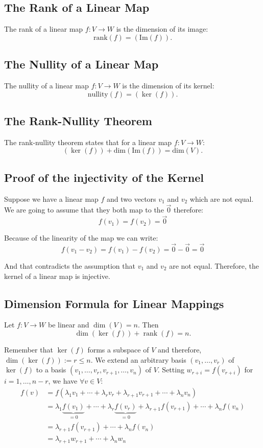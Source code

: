 \subsection{The Rank of a Linear Map}
The rank of a linear map \( f: V \to W \) is the dimension of its image:
    \[
    \text{rank}(f) = (\text{Im}(f)).
    \]
\subsection{The Nullity of a Linear Map}
The nullity of a linear map \( f: V \to W \) is the dimension of its kernel:
    \[
    \text{nullity}(f) = (\ker(f)).
    \]
\subsection{The Rank-Nullity Theorem}
The rank-nullity theorem states that for a linear map \( f: V \to W \):
\[
\text{}(\ker(f)) + \text{dim}(\text{Im}(f)) = \text{dim}(V).
\]

\subsection{Proof of the injectivity of the Kernel}

Suppose we have a linear map \(f\) and two vectors \(v_1\) and \(v_2\) which are not equal.
 We are going to assume that they both map to the \(\vec{0}\) therefore:
\[
f(v_1) = f(v_2) = \vec{0}
\]

 Because of the linearity of the map we can write:
\[
f(v_1 - v_2) = f(v_1) - f(v_2) = \vec{0} - \vec{0} = \vec{0}
\]

 And that contradicts the assumption that \(v_1\) and 
 \(v_2\) are not equal. Therefore, the kernel of a linear map is injective.

\subsection{Dimension Formula for Linear Mappings}
    Let \(f: V \to W\) be linear and \(\dim(V) = n\). Then
    \[\dim(\ker(f)) + \operatorname{rank}(f) = n.\]
    
    
    Remember that \(\ker(f)\) forms a subspace of \(V\) and therefore, \(\dim(\ker(f)) := r \leq n\). We extend an arbitrary basis \((v_1, \ldots, v_r)\) of \(\ker(f)\) to a basis \((v_1, \ldots, v_r, v_{r+1}, \ldots, v_n)\) of \(V\). Setting \(w_{r+i} = f(v_{r+i})\) for \(i = 1, \ldots, n - r\), we have \(\forall v \in V\):
    \begin{align*}
    f(v) &= f(\lambda_1v_1 + \cdots + \lambda_r v_r + \lambda_{r+1}v_{r+1} + \cdots + \lambda_n v_n) \\
    &= \lambda_1 \underbrace{f(v_1)}_{=0} + \cdots + \lambda_r \underbrace{f(v_r)}_{=0} + \lambda_{r+1} f(v_{r+1}) + \cdots + \lambda_n f(v_n) \\
    &= \lambda_{r+1} f(v_{r+1}) + \cdots + \lambda_n f(v_n) \\
    &= \lambda_{r+1}w_{r+1} + \cdots + \lambda_n w_n
    \end{align*}
    
